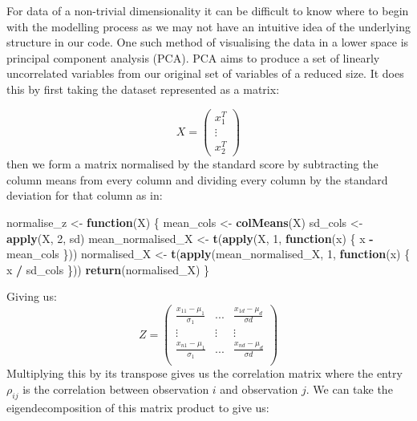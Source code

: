\documentclass[]{article}
\newenvironment{Shaded}{\begin{snugshade}}{\end{snugshade}}
\newcommand{\KeywordTok}[1]{\textcolor[rgb]{0.13,0.29,0.53}{\textbf{#1}}}
\newcommand{\DecValTok}[1]{\textcolor[rgb]{0.00,0.00,0.81}{#1}}
\newcommand{\StringTok}[1]{\textcolor[rgb]{0.31,0.60,0.02}{#1}}
\newcommand{\ControlFlowTok}[1]{\textcolor[rgb]{0.13,0.29,0.53}{\textbf{#1}}}
\newcommand{\OperatorTok}[1]{\textcolor[rgb]{0.81,0.36,0.00}{\textbf{#1}}}
\newcommand{\NormalTok}[1]{#1}
\begin{document}
For data of a non-trivial dimensionality it can be difficult to know
where to begin with the modelling process as we may not have an
intuitive idea of the underlying structure in our code. One such method
of visualising the data in a lower space is principal component analysis
(PCA). PCA aims to produce a set of linearly uncorrelated variables from
our original set of variables of a reduced size. It does this by first
taking the dataset represented as a matrix:

\[
X = \begin{pmatrix}
x_{1}^{T} \\
\vdots \\
x_{2}^{T}
\end{pmatrix}
\] then we form a matrix normalised by the standard score by subtracting
the column means from every column and dividing every column by the
standard deviation for that column as in:

\begin{Shaded}
\begin{Highlighting}[]
\NormalTok{normalise_z <-}\StringTok{ }\ControlFlowTok{function}\NormalTok{(X) \{}
\NormalTok{  mean_cols <-}\StringTok{ }\KeywordTok{colMeans}\NormalTok{(X)}
\NormalTok{  sd_cols <-}\StringTok{ }\KeywordTok{apply}\NormalTok{(X, }\DecValTok{2}\NormalTok{, sd)}
\NormalTok{  mean_normalised_X <-}\StringTok{ }\KeywordTok{t}\NormalTok{(}\KeywordTok{apply}\NormalTok{(X, }\DecValTok{1}\NormalTok{, }\ControlFlowTok{function}\NormalTok{(x) \{}
\NormalTok{    x }\OperatorTok{-}\StringTok{ }\NormalTok{mean_cols}
\NormalTok{  \}))}
\NormalTok{  normalised_X <-}\StringTok{ }\KeywordTok{t}\NormalTok{(}\KeywordTok{apply}\NormalTok{(mean_normalised_X, }\DecValTok{1}\NormalTok{, }\ControlFlowTok{function}\NormalTok{(x) \{}
\NormalTok{    x }\OperatorTok{/}\StringTok{ }\NormalTok{sd_cols}
\NormalTok{  \}))}
  \KeywordTok{return}\NormalTok{(normalised_X)}
\NormalTok{\}}
\end{Highlighting}
\end{Shaded}

Giving us: \[
Z = \begin{pmatrix} 
\frac{x_{11} - \mu_{1}}{\sigma_{1}} & ... & \frac{x_{1d} - \mu_{d}}{\sigma{d}} \\
\vdots & \vdots & \vdots \\
\frac{x_{n1} - \mu_{1}}{\sigma_{1}} & ... & \frac{x_{nd} - \mu_{d}}{\sigma{d}} \\
\end{pmatrix}
\] Multiplying this by its transpose gives us the correlation matrix
where the entry \(\rho_{ij}\) is the correlation between observation
\(i\) and observation \(j\). We can take the eigendecomposition of this
matrix product to give us:
\end{document}
